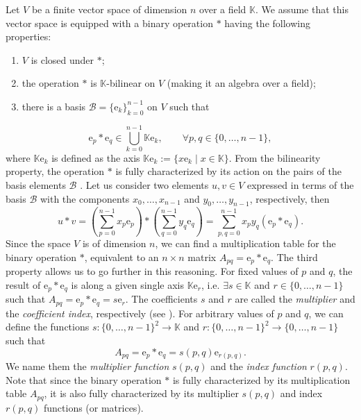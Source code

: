 \documentclass{article}
\begin{document}
Let $V$ be a finite vector space of dimension $n$ over a field $\mathbb{K}$. We assume that this vector space is equipped with a binary operation $*$ having the following properties:
\begin{enumerate}
    \item $V$ is closed under $*$;
    \item the operation $*$ is $\mathbb{K}$-bilinear on $V$ (making it an algebra over a field);
    \item there is a basis $\mathcal{B}=\{\mathrm e_k \}_{k=0}^{n-1}$ on $V$ such that
\end{enumerate}
$$ 
\mathrm e_p * \mathrm e_q \in \bigcup_{k=0}^{n-1} \mathbb{K} \mathrm e_k, \qquad \forall p,q \in \{ 0,\ldots,n-1 \}, 
$$
where $\mathbb{K} \mathrm e_k$ is defined as the axis $\mathbb{K} \mathrm e_k := \{ x \mathrm e_k \mid x \in \mathbb{K} \}.$
From the bilinearity property, the operation $*$ is fully characterized by its action on the pairs of the basis elements $\mathcal B$ \cite{Kantor}. Let us consider two elements $u,v \in V$ expressed in terms of the basis $\mathcal B$ with the components $x_0, \ldots, x_{n-1}$ and $y_0, \ldots, y_{n-1}$, respectively, then
$$ u * v = \left( \sum_{p=0}^{n-1} x_p \mathrm e_p \right) * \left( \sum_{q=0}^{n-1} y_q \mathrm e_q \right) = \sum_{p,q = 0}^{n-1} x_p y_q (\mathrm e_p * \mathrm e_q). $$
Since the space $V$ is of dimension $n$, we can find a multiplication table for the binary operation $*$, equivalent to an $n \times n$ matrix 
$A_{pq} = \mathrm e_p * \mathrm e_q$. 
The third property allows us to go further in this reasoning. For fixed values of $p$ and $q$, the result of $\mathrm e_p * \mathrm e_q$ is along a given single axis $\mathbb{K} \mathrm e_r$, i.e. $\exists s \in \mathbb{K}$ and $r \in \{ 0,\ldots,n-1 \}$ such that $A_{pq} = \mathrm e_p * \mathrm e_q = s \mathrm e_r. $
The coefficients $s$ and $r$ are called the \textit{multiplier} and the \textit{coefficient index}, respectively (see \cite{multiZ}). For arbitrary values of $p$ and $q$, we can define the functions $s : \{ 0,\ldots,n-1 \}^2 \rightarrow \mathbb{K}$ and $r : \{ 0,\ldots,n-1 \}^2 \rightarrow \{ 0,\ldots,n-1 \}$ such that
\begin{equation} 
    \label{multiplier and index introduction} A_{pq} = \mathrm e_p * \mathrm e_q = s(p,q) \mathrm e_{r(p,q)}. 
\end{equation}
We name them the \textit{multiplier function} $s(p,q)$ and the \textit{index function} $r(p,q)$. Note that since the binary operation $*$ is fully characterized by its multiplication table $A_{pq}$, it is also fully characterized by its multiplier $s(p,q)$ and index $r(p,q)$ functions (or matrices). 
\end{document}
